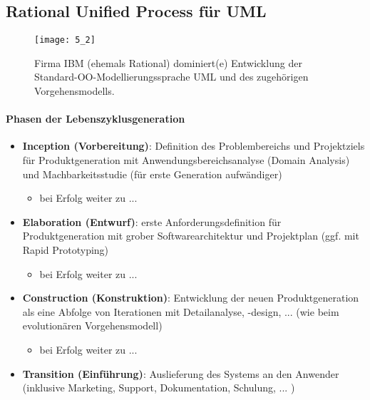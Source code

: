\subsection{Rational Unified Process für UML}
\begin{figure}[h]
	\centering
	\caption{Firma IBM (ehemals Rational) dominiert(e) Entwicklung der Standard-OO-Modellierungssprache UML und des zugehörigen Vorgehensmodells.}
	\texttt{[image: 5\_2]}
\end{figure}

\paragraph{Phasen der Lebenszyklusgeneration}
\begin{itemize}
	\item \textbf{Inception (Vorbereitung)}: Definition des Problembereichs und Projektziels für Produktgeneration mit Anwendungsbereichsanalyse (Domain Analysis) und Machbarkeitsstudie (für erste Generation aufwändiger)
	\begin{itemize}
		\item bei Erfolg weiter zu ...
	\end{itemize}
	\item \textbf{Elaboration (Entwurf)}: erste Anforderungsdefinition für Produktgeneration mit grober Softwarearchitektur und Projektplan (ggf. mit Rapid Prototyping)
	\begin{itemize}
		\item bei Erfolg weiter zu ...
	\end{itemize}
	\item  \textbf{Construction (Konstruktion)}: Entwicklung der neuen Produktgeneration als eine Abfolge von Iterationen mit Detailanalyse, -design, ... (wie beim evolutionären Vorgehensmodell)
	\begin{itemize}
		\item bei Erfolg weiter zu ...
	\end{itemize}
	\item  \textbf{Transition (Einführung)}: Auslieferung des Systems an den Anwender (inklusive Marketing, Support, Dokumentation, Schulung, ... )
\end{itemize}

